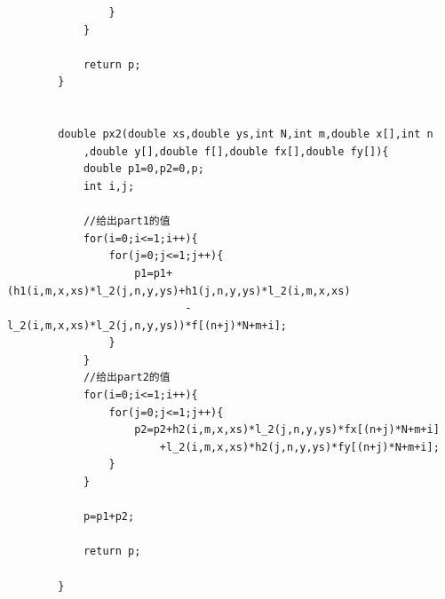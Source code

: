 \documentclass{article}
\begin{document}
\begin{verbatim}
				}
			}
			
			return p;
		}
		
		
		double px2(double xs,double ys,int N,int m,double x[],int n
			,double y[],double f[],double fx[],double fy[]){
			double p1=0,p2=0,p;
			int i,j;
			
			//给出part1的值 
			for(i=0;i<=1;i++){
				for(j=0;j<=1;j++){
					p1=p1+(h1(i,m,x,xs)*l_2(j,n,y,ys)+h1(j,n,y,ys)*l_2(i,m,x,xs)
							-l_2(i,m,x,xs)*l_2(j,n,y,ys))*f[(n+j)*N+m+i];
				}
			}
			//给出part2的值 
			for(i=0;i<=1;i++){
				for(j=0;j<=1;j++){
					p2=p2+h2(i,m,x,xs)*l_2(j,n,y,ys)*fx[(n+j)*N+m+i]
						+l_2(i,m,x,xs)*h2(j,n,y,ys)*fy[(n+j)*N+m+i];
				}
			}
			
			p=p1+p2;
			
			return p;
			
		}
		
	\end{verbatim}
	
\end{document}
